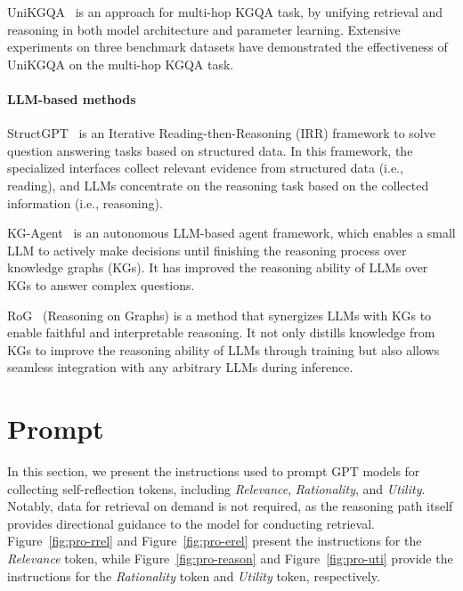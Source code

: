 UniKGQA~\cite{UniKGQA} is an approach for multi-hop KGQA task, by unifying retrieval and reasoning in both model architecture and parameter learning. Extensive experiments on three benchmark datasets have demonstrated the effectiveness of UniKGQA on the multi-hop KGQA task.

\paragraph {LLM-based methods}

StructGPT~\cite{jiang-etal-2023-structgpt} is an Iterative Reading-then-Reasoning (IRR) framework to solve question answering tasks based on structured data. In this framework, the specialized interfaces collect relevant evidence from structured data (i.e., reading), and LLMs concentrate on the reasoning task based on the collected information (i.e., reasoning).

KG-Agent~\cite{jiang2024kg} is an autonomous LLM-based agent framework, which enables a small LLM to actively make decisions until finishing the reasoning process over knowledge graphs (KGs). It has improved the reasoning ability of LLMs over KGs to answer complex questions.

RoG~\cite{luo2023reasoning} (Reasoning on Graphs) is a method that synergizes LLMs with KGs to enable faithful and interpretable reasoning. It not only distills knowledge from KGs to improve the reasoning ability of LLMs through training but also allows seamless integration with any arbitrary LLMs during inference.


\section{Prompt}
\label{app:prompt}
In this section, we present the instructions used to prompt GPT models for collecting self-reflection tokens, including \textit{Relevance}, \textit{Rationality}, and \textit{Utility}. Notably, data for retrieval on demand is not required, as the reasoning path itself provides directional guidance to the model for conducting retrieval. Figure~\ref{fig:pro-rrel} and Figure~\ref{fig:pro-erel} present the instructions for the \textit{Relevance} token, while Figure~\ref{fig:pro-reason} and Figure~\ref{fig:pro-uti} provide the instructions for the \textit{Rationality} token and \textit{Utility} token, respectively.

